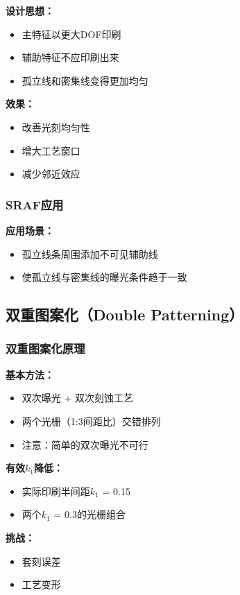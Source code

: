 \documentclass[UTF8,12pt,a4paper]{ctexart}
\begin{document}
\textbf{设计思想：}
\begin{itemize}
    \item 主特征以更大DOF印刷
    \item 辅助特征不应印刷出来
    \item 孤立线和密集线变得更加均匀
\end{itemize}

\textbf{效果：}
\begin{itemize}
    \item 改善光刻均匀性
    \item 增大工艺窗口
    \item 减少邻近效应
\end{itemize}

\subsubsection{SRAF应用}

\textbf{应用场景：}
\begin{itemize}
    \item 孤立线条周围添加不可见辅助线
    \item 使孤立线与密集线的曝光条件趋于一致
\end{itemize}

\subsection{双重图案化（Double Patterning）}

\subsubsection{双重图案化原理}

\textbf{基本方法：}
\begin{itemize}
    \item 双次曝光 + 双次刻蚀工艺
    \item 两个光栅（1:3间距比）交错排列
    \item 注意：简单的双次曝光不可行
\end{itemize}

\textbf{有效$k_1$降低：}
\begin{itemize}
    \item 实际印刷半间距$k_1$ = 0.15
    \item 两个$k_1$ = 0.3的光栅组合
\end{itemize}

\textbf{挑战：}
\begin{itemize}
    \item 套刻误差
    \item 工艺变形
\end{itemize}
\end{document}
